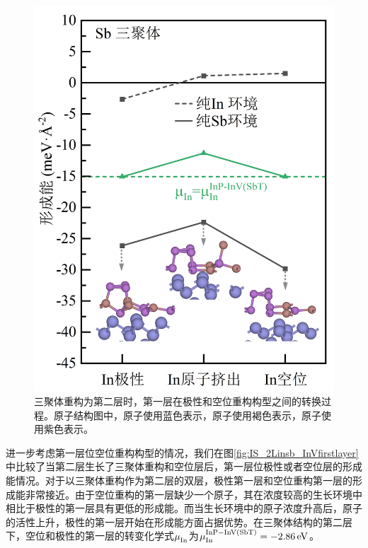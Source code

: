 \begin{figure}[!htb]
    \includegraphics{pic/IS_DFT_2InSb_InPtoInV.png}
    \caption{三聚体重构为第二层时，第一层在极性和空位重构构型之间的转换过程。原子结构图中，原子使用蓝色表示，原子使用褐色表示，原子使用紫色表示。}
    \label{fig:IS_DFT_2InSb_InPtoInV}
\end{figure}

进一步考虑第一层位空位重构构型的情况，我们在图\ref{fig:IS_2Linsb_InVfirstlayer}中比较了当第二层生长了三聚体重构和空位层后，第一层位极性或者空位层的形成能情况。对于以三聚体重构作为第二层的双层，极性第一层和空位重构第一层的形成能非常接近。由于空位重构的第一层缺少一个原子，其在浓度较高的生长环境中相比于极性的第一层具有更低的形成能。而当生长环境中的原子浓度升高后，原子的活性上升，极性的第一层开始在形成能方面占据优势。在三聚体结构的第二层下，空位和极性的第一层的转变化学式$\it \mu_{\rm In}^{\rm } \it$为$\it \mu_{\rm In}^{\rm InP-InV\left(SbT\right)} \it=\SI{-2.86}{\electronvolt}$。

